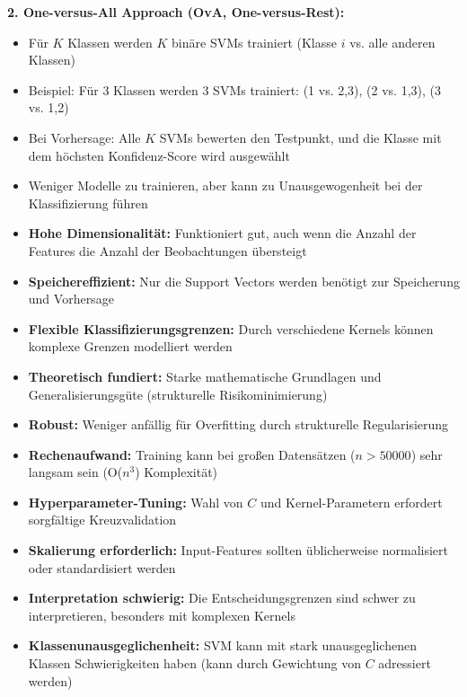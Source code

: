\textbf{2. One-versus-All Approach (OvA, One-versus-Rest):}
\begin{itemize}[leftmargin=1.5em]
    \item Für $K$ Klassen werden $K$ binäre SVMs trainiert (Klasse $i$ vs. alle anderen Klassen)
    \item Beispiel: Für 3 Klassen werden 3 SVMs trainiert: (1 vs. 2,3), (2 vs. 1,3), (3 vs. 1,2)
    \item Bei Vorhersage: Alle $K$ SVMs bewerten den Testpunkt, und die Klasse mit dem höchsten Konfidenz-Score wird ausgewählt
    \item Weniger Modelle zu trainieren, aber kann zu Unausgewogenheit bei der Klassifizierung führen
\end{itemize}

\begin{itemize}[leftmargin=1.5em]
    \item \textbf{Hohe Dimensionalität:} Funktioniert gut, auch wenn die Anzahl der Features die Anzahl der Beobachtungen übersteigt
    \item \textbf{Speichereffizient:} Nur die Support Vectors werden benötigt zur Speicherung und Vorhersage
    \item \textbf{Flexible Klassifizierungsgrenzen:} Durch verschiedene Kernels können komplexe Grenzen modelliert werden
    \item \textbf{Theoretisch fundiert:} Starke mathematische Grundlagen und Generalisierungsgüte (strukturelle Risikominimierung)
    \item \textbf{Robust:} Weniger anfällig für Overfitting durch strukturelle Regularisierung
\end{itemize}

\begin{itemize}[leftmargin=1.5em]
    \item \textbf{Rechenaufwand:} Training kann bei großen Datensätzen ($n > 50000$) sehr langsam sein (O($n^3$) Komplexität)
    \item \textbf{Hyperparameter-Tuning:} Wahl von $C$ und Kernel-Parametern erfordert sorgfältige Kreuzvalidation
    \item \textbf{Skalierung erforderlich:} Input-Features sollten üblicherweise normalisiert oder standardisiert werden
    \item \textbf{Interpretation schwierig:} Die Entscheidungsgrenzen sind schwer zu interpretieren, besonders mit komplexen Kernels
    \item \textbf{Klassenunausgeglichenheit:} SVM kann mit stark unausgeglichenen Klassen Schwierigkeiten haben (kann durch Gewichtung von $C$ adressiert werden)
\end{itemize}

